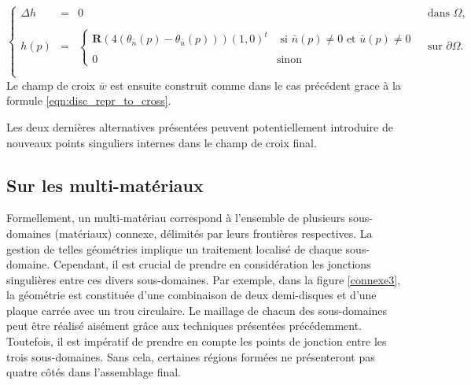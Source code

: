\begin{equation}
\left\{
\begin{array}{lcll}
    \Delta h &=& 0 & \mbox{ dans }\Omega,\\\\
    h(p) &=&
    \left\{
    \begin{array}{ll}
        \mathbf{R}\displaystyle\left(4(\theta_{\bar{n}}(p)-\theta_{\bar{u}}(p))\right)(1, 0)^t &\text{ si }\bar{n}(p)\neq 0\mbox{ et }\bar{u}(p)\neq 0\\\\
        0& \text{sinon}
    \end{array}
    \right.
    &\mbox{ sur }\partial\Omega.\\\\
\end{array}
\right.
\label{eqn:disc_lefeu_2}
\end{equation}
Le champ de croix $\bar{w}$ est ensuite construit comme dans le cas précédent grace à la formule \ref{eqn:disc_repr_to_cross}.

\begin{remark}
Les deux dernières alternatives présentées peuvent potentiellement introduire de nouveaux points singuliers internes dans le champ de croix final.
\end{remark}


\subsection{Sur les multi-matériaux}

Formellement, un multi-matériau correspond à l'ensemble de plusieurs sous-domaines (matériaux) connexe, délimités par leurs frontières respectives. La gestion de telles géométries implique un traitement localisé de chaque sous-domaine. Cependant, il est crucial de prendre en considération les jonctions singulières entre ces divers sous-domaines. Par exemple, dans la figure \ref{connexe3}, la géométrie est constituée d'une combinaison de deux demi-disques et d'une plaque carrée avec un trou circulaire. Le maillage de chacun des sous-domaines peut être réalisé aisément grâce aux techniques présentées précédemment. Toutefois, il est impératif de prendre en compte les points de jonction entre les trois sous-domaines. Sans cela, certaines régions formées ne présenteront pas quatre côtés dans l'assemblage final.

